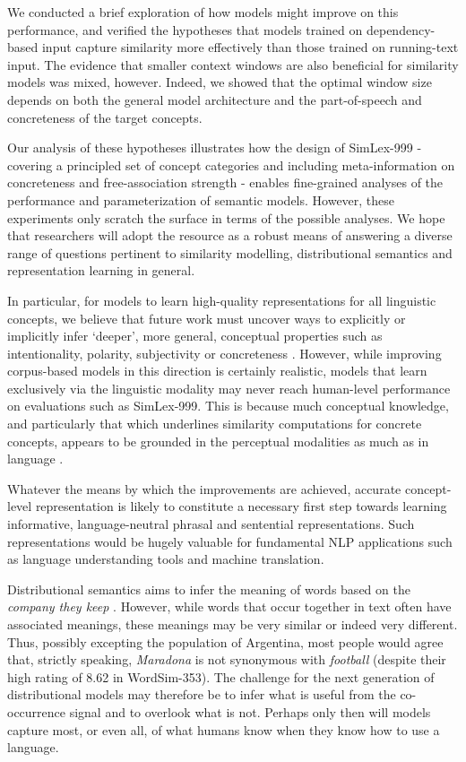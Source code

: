 \documentclass[fullname]{clv2}
\begin{document}
We conducted a brief exploration of how models might improve on this performance, and verified the hypotheses that models trained on dependency-based input capture similarity more effectively than those trained on running-text input. The evidence that smaller context windows are also beneficial for similarity models was mixed, however. Indeed, we showed that the optimal window size depends on both the general model architecture and the part-of-speech and concreteness of the target concepts. 

Our analysis of these hypotheses illustrates how the design of SimLex-999 - covering a principled set of concept categories and including meta-information on concreteness and free-association strength - enables fine-grained analyses of the performance and parameterization  of semantic models. However, these experiments only scratch the surface in terms of the possible analyses. We hope that researchers will adopt the resource as a robust means of answering a diverse range of questions pertinent to similarity modelling, distributional semantics and representation learning in general.  

In particular, for models to learn high-quality representations for all linguistic concepts, we believe that future work must uncover ways to explicitly or implicitly infer `deeper', more general, conceptual properties such as intentionality, polarity, subjectivity or concreteness \cite{gershmanmetaphor}. However, while improving corpus-based models in this direction is certainly realistic, models that learn exclusively via the linguistic modality may never reach human-level performance on evaluations such as SimLex-999. This is because much conceptual knowledge, and particularly that which underlines similarity computations for concrete concepts, appears to be grounded in the perceptual modalities as much as in language \cite{barsalou2003grounding}. 

Whatever the means by which the improvements are achieved, accurate concept-level representation is likely to constitute a necessary first step towards learning informative, language-neutral phrasal and sentential representations. Such representations would be hugely valuable for fundamental NLP applications such as language understanding tools and machine translation. 

Distributional semantics aims to infer the meaning of words based on the \emph{company they keep} \cite{firth1957papers}. However, while words that occur together in text often have associated meanings, these meanings may be very similar or indeed very different. Thus, possibly excepting the population of Argentina, most people would agree that, strictly speaking, \emph{Maradona} is not synonymous with \emph{football} (despite their high rating of 8.62 in WordSim-353). The challenge for the next generation of distributional models may therefore be to infer what is useful from the co-occurrence signal and to overlook what is not. Perhaps only then will models capture most, or even all, of what humans know when they know how to use a language. 




\starttwocolumn 


\end{document}

